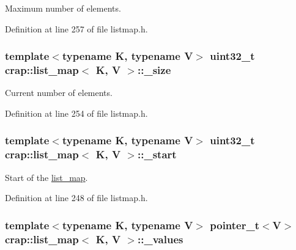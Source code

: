 Maximum number of elements. 



Definition at line 257 of file listmap.\+h.

\hypertarget{classcrap_1_1list__map_a0bd6a5300ca68f956964a6d9edb02757}{}
\subsubsection[{\+\_\+size}]{\setlength{\rightskip}{0pt plus 5cm}template$<$typename K, typename V$>$ uint32\+\_\+t {\bf crap\+::list\+\_\+map}$<$ K, V $>$\+::\+\_\+size\hspace{0.3cm}{\ttfamily [protected]}}\label{classcrap_1_1list__map_a0bd6a5300ca68f956964a6d9edb02757}


Current number of elements. 



Definition at line 254 of file listmap.\+h.

\hypertarget{classcrap_1_1list__map_aff95986154fe7aa854edf0973e477f82}{}
\subsubsection[{\+\_\+start}]{\setlength{\rightskip}{0pt plus 5cm}template$<$typename K, typename V$>$ uint32\+\_\+t {\bf crap\+::list\+\_\+map}$<$ K, V $>$\+::\+\_\+start\hspace{0.3cm}{\ttfamily [protected]}}\label{classcrap_1_1list__map_aff95986154fe7aa854edf0973e477f82}


Start of the \hyperlink{classcrap_1_1list__map}{list\+\_\+map}. 



Definition at line 248 of file listmap.\+h.

\hypertarget{classcrap_1_1list__map_acba7dbe40068c27c619e0f44235125c9}{}
\subsubsection[{\+\_\+values}]{\setlength{\rightskip}{0pt plus 5cm}template$<$typename K, typename V$>$ {\bf pointer\+\_\+t}$<$V$>$ {\bf crap\+::list\+\_\+map}$<$ K, V $>$\+::\+\_\+values\hspace{0.3cm}{\ttfamily [protected]}}\label{classcrap_1_1list__map_acba7dbe40068c27c619e0f44235125c9}


